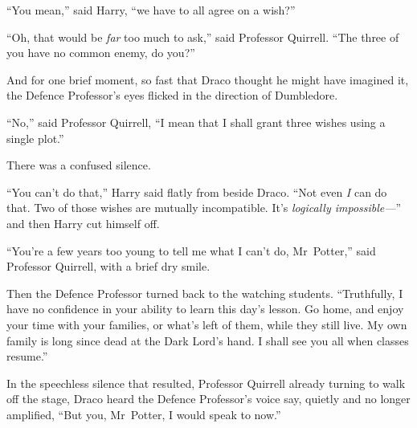 “You mean,” said Harry, “we have to all agree on a wish?”

“Oh, that would be \emph{far} too much to ask,” said Professor Quirrell. “The
three of you have no common enemy, do you?”

And for one brief moment, so fast that Draco thought he might have imagined it,
the Defence Professor’s eyes flicked in the direction of Dumbledore.

“No,” said Professor Quirrell, “I mean that I shall grant three wishes using a
single plot.”

There was a confused silence.

“You can’t do that,” Harry said flatly from beside Draco. “Not even \emph{I}
can do that. Two of those wishes are mutually incompatible. It’s
\emph{logically impossible—}” and then Harry cut himself off.

“You’re a few years too young to tell me what I can’t do, Mr~Potter,” said
Professor Quirrell, with a brief dry smile.

Then the Defence Professor turned back to the watching students. “Truthfully, I
have no confidence in your ability to learn this day’s lesson. Go home, and
enjoy your time with your families, or what’s left of them, while they still
live. My own family is long since dead at the Dark Lord’s hand. I shall see you
all when classes resume.”

In the speechless silence that resulted, Professor Quirrell already turning to
walk off the stage, Draco heard the Defence Professor’s voice say, quietly and
no longer amplified, “But you, Mr~Potter, I would speak to now.”
